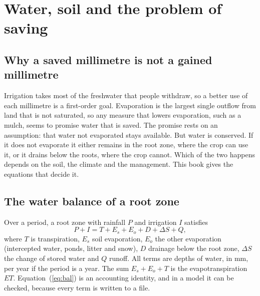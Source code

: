 \chapter{Water, soil and the problem of saving}

\section{Why a saved millimetre is not a gained millimetre}
Irrigation takes most of the freshwater that people withdraw, so a better use of each millimetre is a first-order goal. Evaporation is the largest single outflow from land that is not saturated, so any measure that lowers evaporation, such as a mulch, seems to promise water that is saved. The promise rests on an assumption: that water not evaporated stays available. But water is conserved. If it does not evaporate it either remains in the root zone, where the crop can use it, or it drains below the roots, where the crop cannot. Which of the two happens depends on the soil, the climate and the management. This book gives the equations that decide it.


\section{The water balance of a root zone}
Over a period, a root zone with rainfall $P$ and irrigation $I$ satisfies
\begin{equation}\label{eq:bal}\boxed{P + I = T + E_s + E_o + D + \Delta S + Q ,}\end{equation}
where $T$ is transpiration, $E_s$ soil evaporation, $E_o$ the other evaporation (intercepted water, ponds, litter and snow), $D$ drainage below the root zone, $\Delta S$ the change of stored water and $Q$ runoff. All terms are depths of water, in mm, per year if the period is a year. The sum $E_s+E_o+T$ is the evapotranspiration $ET$. Equation~(\ref{eq:bal}) is an accounting identity, and in a model it can be checked, because every term is written to a file.

